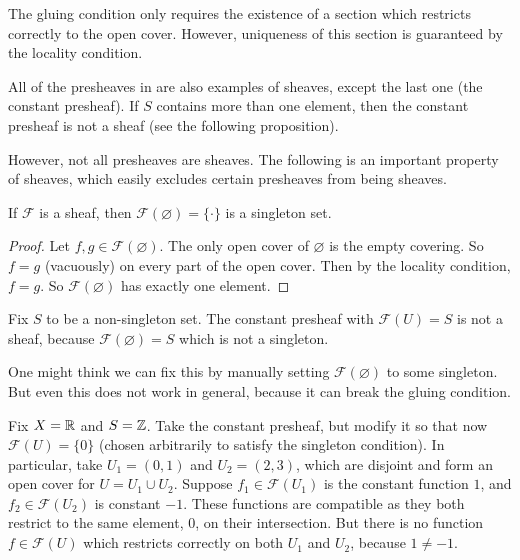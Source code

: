 \begin{remark}
    The gluing condition only requires the existence of a section which restricts correctly to the open cover. However, uniqueness of this section is guaranteed by the locality condition.
\end{remark}

\begin{example} All of the presheaves in  are also examples of sheaves, except the last one (the constant presheaf).  If \(S\) contains more than one element, then the constant presheaf is not a sheaf (see the following proposition). 
\end{example}

However, not all presheaves are sheaves. The following is an important property of sheaves, which easily excludes certain presheaves from being sheaves.

\begin{proposition}
    If $\mathcal{F}$ is a sheaf, then $\mathcal{F}(\varnothing) = \{\cdot\}$ is a singleton set. 
\end{proposition}

\begin{proof}
    Let $f, g \in \mathcal{F}(\varnothing)$. The only open cover of $\varnothing$ is the empty covering. So $f = g$ (vacuously) on every part of the open cover. Then by the locality condition, $f = g$. So $\mathcal{F}(\varnothing)$ has exactly one element.
\end{proof}



\begin{nonexample}
    Fix $S$ to be a non-singleton set. The constant presheaf with $\mathcal{F}(U) = S$ is not a sheaf, because $\mathcal{F}(\varnothing) = S$ which is not a singleton.
\end{nonexample}

One might think we can fix this by manually setting $\mathcal{F}(\varnothing)$ to some singleton. But even this does not work in general, because it can break the gluing condition.

\begin{nonexample}
    Fix $X = \mathbb{R}$ and $S = \mathbb{Z}$. Take the constant presheaf, but modify it so that now $\mathcal{F}(U) = \{0\}$ (chosen arbitrarily to satisfy the singleton condition). In particular, take $U_1 = (0,1)$ and $U_2 = (2,3)$, which are disjoint and form an open cover for $U = U_1 \cup U_2$. Suppose $f_1 \in \mathcal{F}(U_1)$ is the constant function $1$, and $f_2 \in \mathcal{F}(U_2)$ is constant $-1$. These functions are compatible as they both restrict to the same element, $0$, on their intersection. But there is no function $f \in \mathcal{F}(U)$ which restricts correctly on both $U_1$ and $U_2$, because $1 \neq -1$.
\end{nonexample}

